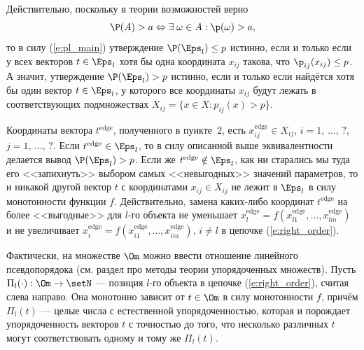 Действительно, поскольку в теории возможностей верно
\begin{equation*}
  \P(A) > a \Leftrightarrow \exists\;\omega \in A: \p(\omega) > a,
\end{equation*}
то в силу (\ref{e:pl_main}) утверждение $\P(\Eps_l) \leq p$ истинно, если и только если у всех векторов $t \in \Eps_l$ хотя бы одна координата $x_{ij}$ такова, что $\p_{ij}(x_{ij}) \leq p$. А значит, %
утверждение $\P(\Eps_l) > p$ истинно, если и только если найдётся хотя бы один вектор $t \in \Eps_l$, у которого все координаты $x_{ij} $ будут лежать в соответствующих подмножествах $X_{ij} = \{x \in X: p_{ij}(x) > p\}$. 

Координаты вектора $t^\text{edge}$, полученного в пункте~2, есть $x_{ij}^\text{edge} \in X_{ij}$, $i=1,\, \ldots,\, ?$, $j=1,\, \ldots,\, ?$.
Если $t^\text{edge} \in \Eps_l$, то в силу описанной выше эквивалентности делается вывод $\P(\Eps_l) > p$. Если же $t^\text{edge} \notin \Eps_l$, как ни старались мы туда его <<запихнуть>> выбором самых <<невыгодных>> значений параметров, то и никакой другой вектор $t$ с координатами $x_{ij} \in X_{ij}$ не лежит в $\Eps_l$ в силу монотонности функции $f$. Действительно, замена каких-либо координат $t^\text{edge}$ на более <<выгодные>> для $l$-го объекта не уменьшает $x_l^\text{edge} = f(x_{l1}^\text{edge}, ..., x_{lm}^\text{edge})$ и не увеличивает $x_i^\text{edge} = f(x_{i1}^\text{edge}, ..., x_{im}^\text{edge})$, $i \neq l$ в цепочке (\ref{e:right_order}).

Фактически, на множестве $\Om$ можно ввести отношение линейного псевдопорядока (см. раздел про методы теории упорядоченных множеств). Пусть $\Pi_l(\cdot): \Om \rightarrow \setN$ --- позиция $l$-го объекта в цепочке (\ref{e:right_order}), считая слева направо. Она монотонно зависит от $t \in \Om$ в силу монотонности $f$, причём $\Pi_l (t)$ --- целые числа с естественной упорядоченностью, которая и порождает упорядоченность векторов $t$ с точностью до того, что несколько различных $t$ могут соответствовать одному и тому же $\Pi_l(t)$. 

